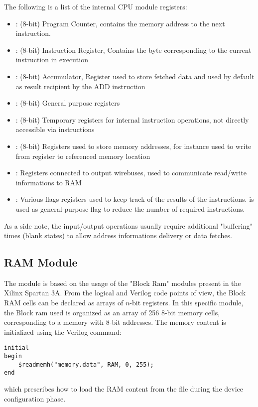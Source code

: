 The following is a list of the internal CPU module registers:
\begin{itemize}
    \item {}: (8-bit) Program Counter, contains the memory address to the next instruction.
    \item {}: (8-bit) Instruction Register, Contains the byte corresponding to the current instruction in execution
    \item {}: (8-bit) Accumulator, Register used to store fetched data and used by default as result recipient by the ADD instruction
    \item {}: (8-bit) General purpose registers
    \item {}: (8-bit) Temporary registers for internal instruction operations, not directly accessible via instructions
    \item {}: (8-bit) Registers used to store memory addresses, for instance used to write from register to referenced memory location
    \item {}: Registers connected to output wirebuses, used to communicate read/write informations to RAM
    \item {}: Various flags registers used to keep track of the results of the instructions.
     is used as general-purpose flag to reduce the number of required instructions.
\end{itemize}

As a side note, the input/output operations usually require additional "buffering" times (blank states) to allow address informations delivery or data fetches.

\subsection{RAM Module}  \label{ssec:ram}
The  module is based on the usage of the "Block Ram" modules present in the Xilinx Spartan 3A.
From the logical and Verilog code points of view, the Block RAM cells can be declared as arrays of $n$-bit registers.
In this specific module, the Block ram used is organized as an array of 256 8-bit memory cells, corresponding to a memory with 8-bit addresses.
The memory content is initialized using the Verilog command:
\begin{verbatim}
initial
begin
	$readmemh("memory.data", RAM, 0, 255);
end
\end{verbatim}
which prescribes how to load the RAM content from the file  during the device configuration phase.

